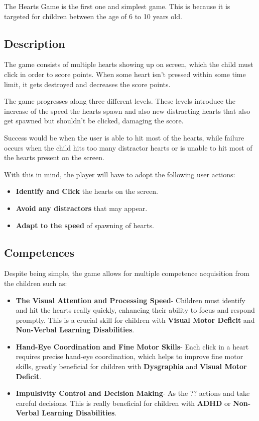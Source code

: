 The Hearts Game is the first one and simplest game. This is because it is targeted for children between the age of 6 to 10 years old.

\subsection*{Description}
The game consists of multiple hearts showing up on screen, which the child must click in order to score points. When some heart isn't pressed within some time limit, it gets destroyed and decreases the score points.

The game progresses along three different levels. These levels introduce the increase of the speed the hearts spawn and also new distracting hearts that also get spawned but shouldn't be clicked, damaging the score.

Success would be when the user is able to hit most of the hearts, while failure occurs when the child hits too many distractor hearts or is unable to hit most of the hearts present on the screen.

With this in mind, the player will have to adopt the following user actions:

\begin{itemize}
    \item \textbf{Identify and Click} the hearts on the screen.
    \item \textbf{Avoid any distractors} that may appear.
    \item \textbf{Adapt to the speed} of spawning of hearts.
\end{itemize}

\subsection*{Competences}
Despite being simple, the game allows for multiple competence acquisition from the children such as:

\begin{itemize}
    \item \textbf{The Visual Attention and Processing Speed}- Children must identify and hit the hearts really quickly, enhancing their ability to focus and respond promptly. This is a crucial skill for children with \textbf{Visual Motor Deficit} and \textbf{Non-Verbal Learning Disabilities}.
    \item \textbf{Hand-Eye Coordination and Fine Motor Skills}- Each click in a heart requires precise hand-eye coordination, which helps to improve fine motor skills, greatly beneficial for children with \textbf{Dysgraphia} and \textbf{Visual Motor Deficit}.
    \item \textbf{Impulsivity Control and Decision Making}- As the ?? actions and take careful decisions. This is really beneficial for children with \textbf{ADHD} or \textbf{Non-Verbal Learning Disabilities}.
    
\end{itemize}


